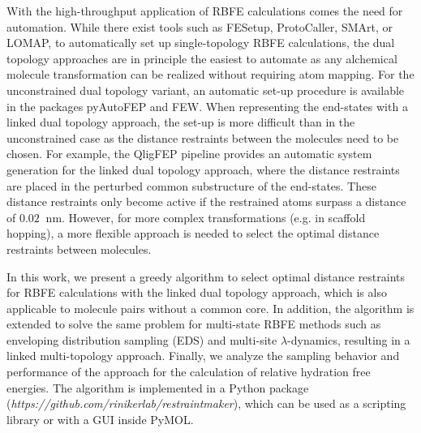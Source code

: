With the high-throughput application of RBFE calculations comes the need for automation.\cite{Christ2014} While there exist tools such as FESetup,\cite{Loeffler2015} ProtoCaller,\cite{Suruzhon2020} SMArt,\cite{Petrov2021} or LOMAP,\cite{Liu2013} to automatically set up single-topology RBFE calculations, the dual topology approaches are in principle the easiest to automate as any alchemical molecule transformation can be realized without requiring atom mapping.\cite{Rocklin2013}
For the unconstrained dual topology variant, an automatic set-up procedure is available in the packages pyAutoFEP\cite{Carvalho2021} and FEW\cite{Homeyer2013}.
When representing the end-states with a linked dual topology approach, the set-up is more difficult than in the unconstrained case as the distance restraints between the molecules need to be chosen.
For example, the QligFEP pipeline\cite{Jespers2019} provides an automatic system generation for the linked dual topology approach, where the distance restraints are placed in the perturbed common substructure of the end-states. These distance restraints only become active if the restrained atoms surpass a distance of $0.02~$ nm.
However, for more complex transformations (e.g. in scaffold hopping), a more flexible approach is needed to select the optimal distance restraints between molecules.

In this work, we present a greedy algorithm to select optimal distance restraints for RBFE calculations with the linked dual topology approach, which is also applicable to molecule pairs without a common core. In addition, the algorithm is extended to solve the same problem for multi-state RBFE methods such as enveloping distribution sampling (EDS)\cite{Christ2007,Christ2008} and multi-site $\lambda$-dynamics,\cite{Knight2011} resulting in a linked multi-topology approach. Finally, we analyze the sampling behavior and performance of the approach for the calculation of relative hydration free energies. The algorithm is implemented in a Python package\\ (\textit{https://github.com/rinikerlab/restraintmaker}), which can be used as a scripting library or with a GUI inside PyMOL. \cite{Delano2020}